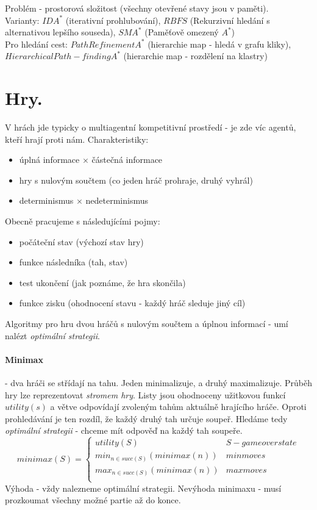 \documentclass[a4paper]{article}      %
\begin{document}
Problém - prostorová složitost (všechny otevřené stavy jsou v paměti).\\
Varianty: $IDA^*$ (iterativní prohlubování), $RBFS$ (Rekurzivní hledání s alternativou lepšího souseda), $SMA^*$ (Paměťově omezený $A^*$)\\
Pro hledání cest: $PathRefinementA^*$ (hierarchie map - hledá v grafu kliky), $Hierarchical Path-finding A^*$ (hierarchie map - rozdělení na klastry)

\section{Hry.} V hrách jde typicky o multiagentní kompetitivní prostředí - je zde víc agentů, kteří hrají proti nám.
Charakteristiky:
\begin{itemize}
\item úplná informace $\times$ částečná informace
\item hry s nulovým součtem (co jeden hráč prohraje, druhý vyhrál)
\item determinismus $\times$ nedeterminismus
\end{itemize}
Obecně pracujeme s následujícími pojmy:
\begin{itemize}
\item počáteční stav (výchozí stav hry)
\item funkce následníka (tah, stav)
\item test ukončení (jak poznáme, že hra skončila)
\item funkce zisku (ohodnocení stavu - každý hráč sleduje jiný cíl)
\end{itemize}

Algoritmy pro hru dvou hráčů s nulovým součtem a úplnou informací - umí nalézt \emph{optimální strategii}.

\paragraph{Minimax} - dva hráči se střídají na tahu.
Jeden minimalizuje, a druhý maximalizuje. Průběh hry lze reprezentovat \emph{stromem hry}.
Listy jsou ohodnoceny užitkovou funkcí $utility(s)$ a větve odpovídají zvoleným tahům aktuálně hrajícího hráče.
Oproti prohledávání je ten rozdíl, že každý druhý tah určuje soupeř.
Hledáme tedy \emph{optimální strategii} - chceme mít odpověď na každý tah soupeře.
\[
minimax(S)= \left\{
\begin{array}{lr}
utility(S) & S - game over state\\
min_{n \in succ(S)}(minimax(n)) & min moves\\
max_{n \in succ(S)}(minimax(n)) & max moves\\
\end{array}\right.
\]
Výhoda - vždy nalezneme optimální strategii.
Nevýhoda minimaxu - musí prozkoumat všechny možné partie až do konce.
\end{document}
